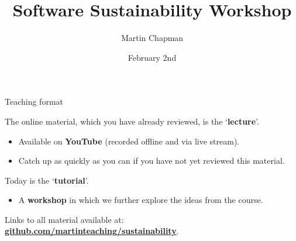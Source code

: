 \documentclass[10pt, dvipsnames, table, aspectratio=169]{beamer}
\title{Software Sustainability Workshop}
\subtitle{}
\date{February 2nd}
\author{Martin Chapman}
\institute{King's College London}
\begin{document}


\begin{frame}[fragile]{Teaching format}

The online material, which you have already reviewed, is the `\textbf{lecture}'.

\begin{itemize}

    \item Available on \textbf{YouTube} (recorded offline and via live stream).

    \item Catch up as quickly as you can if you have not yet reviewed this material.

\end{itemize}

Today is the `\textbf{tutorial}'.

\begin{itemize}

    \item A \textbf{workshop} in which we further explore the ideas from the course.

\end{itemize}

Links to all material available at:
\href{https://github.com/martinteaching/sustainability}{\textbf{github.com/martinteaching/sustainability}}.

\end{frame}

\end{document}
